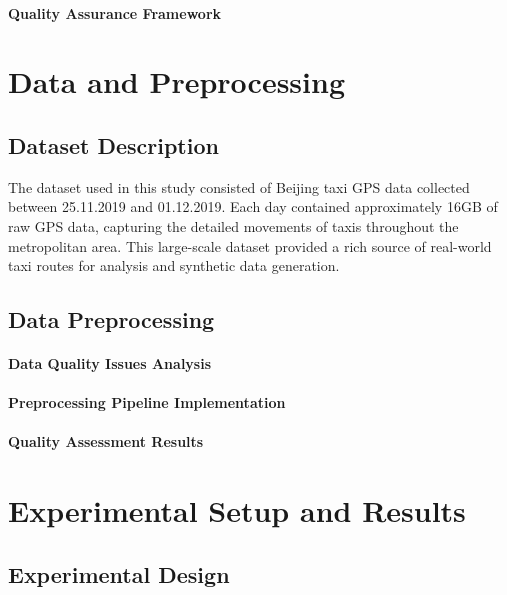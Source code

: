 \documentclass[runningheads]{llncs}
\begin{document}
\paragraph{Quality Assurance Framework}

\section{Data and Preprocessing}
\label{sec:data-preprocessing}

\subsection{Dataset Description}
\label{sec:data}

The dataset used in this study consisted of Beijing taxi GPS data collected between 25.11.2019 and 01.12.2019. Each day contained approximately 16GB of raw GPS data, capturing the detailed movements of taxis throughout the metropolitan area. This large-scale dataset provided a rich source of real-world taxi routes for analysis and synthetic data generation.

\subsection{Data Preprocessing}
\label{sec:preprocessing}

\paragraph{Data Quality Issues Analysis}

\paragraph{Preprocessing Pipeline Implementation}

\paragraph{Quality Assessment Results}

\section{Experimental Setup and Results}
\label{sec:evaluation}

\subsection{Experimental Design}
\label{sec:exp-design}
\end{document}
